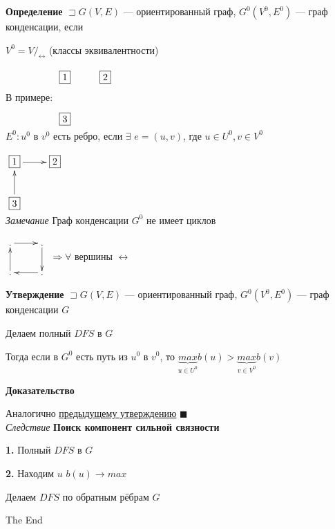 \documentclass[a4paper, 12pt] {article}
\begin{document}
\textbf{Определение} $ \sqsupset G(V, E)$ --- ориентированный граф, $  G^{0}(V^{0}, E^{0})$ --- граф конденсации, если

$ V^{0}=V /_{\leftrightarrow} $ (классы эквивалентности)

В примере: 
$ 
\begin{matrix}
	\xymatrix{
		\fbox{1}  & \fbox{2} \\
		\fbox{3} \\
	}
\end{matrix} $\\

$ E^{0}: u^{0} $ в $ v^{0} $ есть ребро, если 
$ \exists$  $ e=(u, v) $, где $ u \in U^{0}, v \in V^{0} $

$ 
\begin{matrix}
	\xymatrix{
		\fbox{1} \ar@{->}[r]  & \fbox{2} \\
		\fbox{3} \ar@{->}[u] \\
	}
\end{matrix} $\\

\textit{Замечание} Граф конденсации $ G^{0} $ не имеет циклов

$ 
\begin{matrix}
	\xymatrix{
		. \ar@{->}[r]  & . \ar@{->}[d] \\
		. \ar@{->}[u] & . \ar@{->}[l] \\
	}
\end{matrix} $ $ \Rightarrow \forall $ вершины $ \leftrightarrow $

\newpage

\textbf{Утверждение} $ \sqsupset G(V, E)$ --- ориентированный граф, $  G^{0}(V^{0}, E^{0})$ --- граф конденсации $ G $

Делаем полный $ DFS $ в $ G $

Тогда если в $ G^{0} $ есть путь из $ u^{0} $  в $ v^{0} $,
то $ \underbrace{max}_{u \in U^{0}} b(u) > \underbrace{max}_{v \in V^{0}} b(v) $

\textbf{Доказательство}

Аналогично \hyperlink{d7}{предыдущему утверждению} $ \blacksquare $\\

\textit{Следствие} \textbf{Поиск компонент сильной связности
}

\textbf{1.} Полный $ DFS $ в $ G $

\textbf{2.} Находим $ u $  $b(u) \rightarrow max $

Делаем $ DFS $ по обратным рёбрам $ G $\\

\begin{center}
	The End
\end{center}
\end{document}
